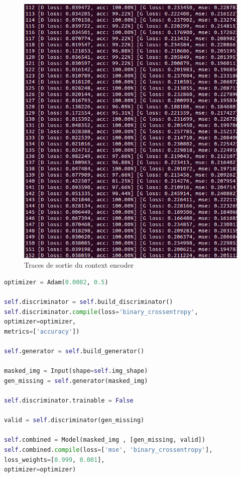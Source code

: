 \documentclass[11pt,a4paper]{article}
\begin{document}
        \begin{figure}[H]
            \centering
            \includegraphics[scale=0.35]{result_performance.png} 
            \caption{Traces de sortie du context encoder}
        \end{figure}
    \begin{lstlisting}[language=Python, caption=Code Python de l'entrainement]
optimizer = Adam(0.0002, 0.5)

self.discriminator = self.build_discriminator()
self.discriminator.compile(loss='binary_crossentropy',
optimizer=optimizer,
metrics=['accuracy'])

self.generator = self.build_generator()

masked_img = Input(shape=self.img_shape)
gen_missing = self.generator(masked_img)

self.discriminator.trainable = False

valid = self.discriminator(gen_missing)

self.combined = Model(masked_img , [gen_missing, valid])
self.combined.compile(loss=['mse', 'binary_crossentropy'],
loss_weights=[0.999, 0.001],
optimizer=optimizer)\end{lstlisting}
\end{document}

